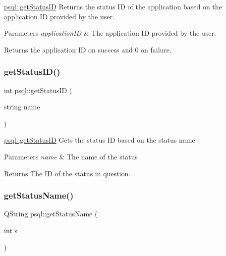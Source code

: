 \mbox{\hyperlink{classpsql_a9c02c92c09cb60c35d24375673b7df06}{psql\+::get\+Status\+ID}} Returns the status ID of the application based on the application ID provided by the user. 


\begin{DoxyParams}{Parameters}
{\em application\+ID} & The application ID provided by the user. \\
\hline
\end{DoxyParams}
\begin{DoxyReturn}{Returns}
the application ID on success and 0 on failure. 
\end{DoxyReturn}
\mbox{\label{classpsql_a9d13aebcb6d151719769207238865e75}} 
\subsubsection{\texorpdfstring{get\+Status\+I\+D()}{getStatusID()}\hspace{0.1cm}{\footnotesize\ttfamily [2/2]}}
{\footnotesize\ttfamily int psql\+::get\+Status\+ID (\begin{DoxyParamCaption}\item[{string}]{name }\end{DoxyParamCaption})}



\mbox{\hyperlink{classpsql_a9c02c92c09cb60c35d24375673b7df06}{psql\+::get\+Status\+ID}} Gets the status ID based on the status name 


\begin{DoxyParams}{Parameters}
{\em name} & The name of the status \\
\hline
\end{DoxyParams}
\begin{DoxyReturn}{Returns}
The ID of the status in question. 
\end{DoxyReturn}
\mbox{\label{classpsql_a5c2a64419a68a258071fd1f9a37c7c09}} 
\subsubsection{\texorpdfstring{get\+Status\+Name()}{getStatusName()}}
{\footnotesize\ttfamily Q\+String psql\+::get\+Status\+Name (\begin{DoxyParamCaption}\item[{int}]{s }\end{DoxyParamCaption})}



